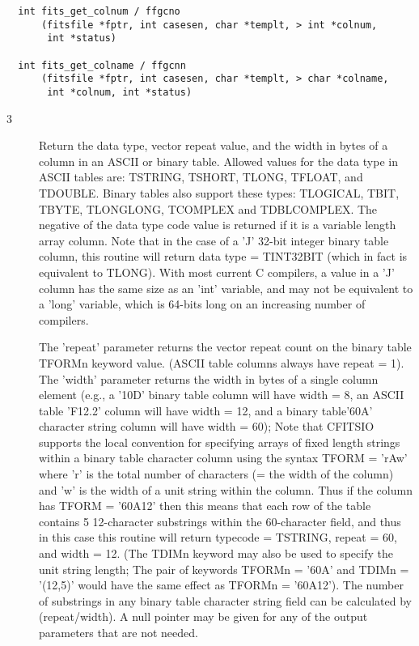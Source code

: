 \documentclass[11pt]{book}
\begin{document}
\begin{verbatim}
  int fits_get_colnum / ffgcno
      (fitsfile *fptr, int casesen, char *templt, > int *colnum,
       int *status)

  int fits_get_colname / ffgcnn
      (fitsfile *fptr, int casesen, char *templt, > char *colname,
       int *colnum, int *status)
\end{verbatim}

\begin{description}
\item[3 ] Return the data type, vector repeat value, and the width in bytes
    of a column in an ASCII or binary table.  Allowed values for the
    data type in ASCII tables are:  TSTRING, TSHORT, TLONG, TFLOAT, and
    TDOUBLE.  Binary tables also support these types: TLOGICAL, TBIT,
    TBYTE, TLONGLONG, TCOMPLEX and TDBLCOMPLEX.  The negative of the data type code
    value is returned if it is a variable length array column.  Note
    that in the case of a 'J' 32-bit integer binary table column, this
    routine will return data type = TINT32BIT (which in fact is
    equivalent to TLONG).  With most current C compilers, a value in a
    'J' column has the same size as an 'int' variable, and may not be
    equivalent to a 'long' variable, which is 64-bits long on an
    increasing number of compilers.

    The 'repeat' parameter returns the vector repeat count on the binary
    table TFORMn keyword value. (ASCII table columns always have repeat
    = 1).  The 'width' parameter returns the width in bytes of a single
    column element (e.g., a '10D' binary table column will have width =
    8, an ASCII table 'F12.2' column will have width = 12, and a binary
    table'60A' character string  column will have width = 60);  Note that
    CFITSIO supports the local convention for specifying arrays of
    fixed length strings within a binary table character column using
    the syntax TFORM = 'rAw' where 'r' is the total number of characters
    (= the width of the column) and 'w' is the width of a unit string
    within the column.  Thus if the column has TFORM = '60A12' then this
    means that each row of the table contains 5 12-character substrings
    within the 60-character field, and thus in this case this routine will
    return typecode = TSTRING, repeat = 60, and width = 12.  (The TDIMn
    keyword may also be used to specify the unit string length; The pair
    of keywords TFORMn = '60A' and TDIMn = '(12,5)'  would have the
    same effect as TFORMn = '60A12').  The number
    of substrings in any binary table character string field can be
    calculated by (repeat/width).  A null pointer may be given for any of
    the output parameters that are not needed.


\end{description}
\end{document}
